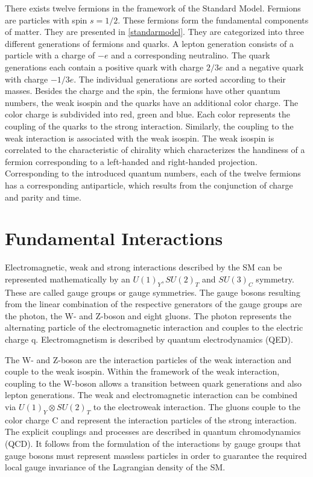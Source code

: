 \documentclass[12pt, a4paper]{thesis}
\begin{document}
There exists twelve fermions in the framework of the Standard
Model. Fermions are particles with spin \(s = 1/2\). These fermions
form the fundamental components of matter. They are presented in
\ref{standarmodel}. They are categorized into three different
generations of fermions and quarks. A lepton generation consists of a
particle with a charge of \(-e\) and a corresponding neutralino. The
quark generations each contain a positive quark with charge \(2/3 e\)
and a negative quark with charge \(- 1/3 e\). The individual
generations are sorted according to their masses. Besides the charge
and the spin, the fermions have other quantum numbers, the weak
isospin and the quarks have an additional color charge. The color
charge is subdivided into red, green and blue. Each color represents
the coupling of the quarks to the strong interaction. Similarly, the
coupling to the weak interaction is associated with the weak
isospin. The weak isospin is correlated to the characteristic of
chirality which characterizes the handiness of a fermion corresponding
to a left-handed and right-handed projection. Corresponding to the
introduced quantum numbers, each of the twelve fermions has a
corresponding antiparticle, which results from the conjunction of
charge and parity and time.

\section{Fundamental Interactions}
\label{sec:org8c44b2a}

Electromagnetic, weak and strong interactions described by the SM can be
represented mathematically by an \(U(1)_{Y}, SU(2)_{T}\) and \(SU(3)_{C}\)
symmetry. These are called gauge groups or gauge symmetries. The gauge bosons
resulting from the linear combination of the respective generators of the gauge
groups are the photon, the W- and Z-boson and eight gluons. The photon
represents the alternating particle of the electromagnetic interaction and
couples to the electric charge q. Electromagnetism is described by quantum
electrodynamics (QED).

The W- and Z-boson are the interaction particles of the weak interaction and
couple to the weak isospin. Within the framework of the weak interaction,
coupling to the W-boson allows a transition between quark generations and also
lepton generations. The weak and electromagnetic interaction can be combined via
\(U(1)_{Y} \otimes SU(2)_{T}\) to the electroweak interaction. The gluons couple
to the color charge C and represent the interaction particles of the strong
interaction. The explicit couplings and processes are described in quantum
chromodynamics (QCD).  It follows from the formulation of the interactions by
gauge groups that gauge bosons must represent massless particles in order to
guarantee the required local gauge invariance of the Lagrangian density of the
SM. 
\end{document}

